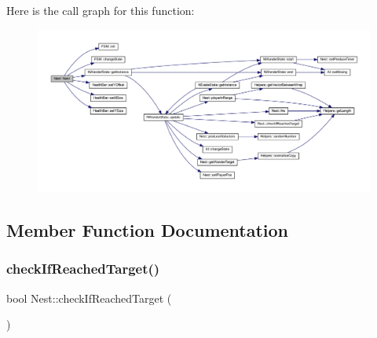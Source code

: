 Here is the call graph for this function\+:
\nopagebreak
\begin{figure}[H]
\begin{center}
\leavevmode
\includegraphics[width=350pt]{class_nest_a2ff01e11d59383d9121c836ea3eb966b_cgraph}
\end{center}
\end{figure}


\subsection{Member Function Documentation}
\mbox{\label{class_nest_ad92f26aa5d487d36eec0818e9d71e9d7}} 
\subsubsection{\texorpdfstring{check\+If\+Reached\+Target()}{checkIfReachedTarget()}}
{\footnotesize\ttfamily bool Nest\+::check\+If\+Reached\+Target (\begin{DoxyParamCaption}{ }\end{DoxyParamCaption})}

